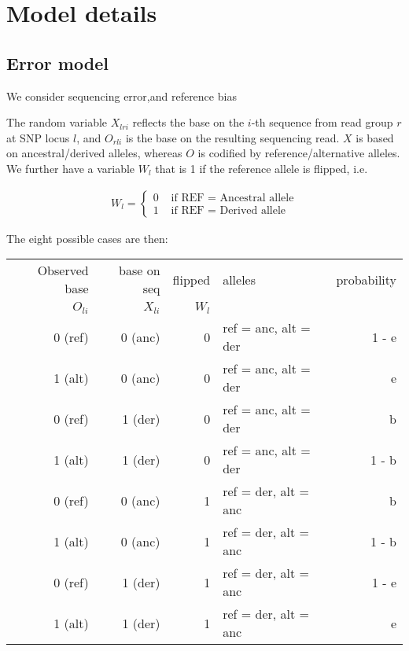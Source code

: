 \documentclass[10pt,a4paper]{article}
\begin{document}
\section*{Model details}
\subsection*{Error model}
We consider sequencing error,and reference bias

The random variable $X_{lri}$ reflects the base on the $i$-th sequence from read group $r$ at SNP locus $l$, and  $O_{rli}$ is the base on the resulting sequencing read. $X$ is based on ancestral/derived alleles, whereas $O$ is codified by reference/alternative alleles. We further have a variable $W_l$ that is 1 if the reference allele is flipped, i.e.

\begin{align*}
W_l = \begin{cases}
0 & \text{ if REF = Ancestral allele}\\
1&  \text{ if REF = Derived allele}
\end{cases}
\end{align*}

The eight possible cases are then:

\begin{table}[!ht]
\begin{center}

\begin{tabular}{r r r l | r}
Observed base & base on seq & flipped & alleles & probability\\
$O_{li}$ & $X_{li}$ & $W_l$ &\\
\hline
0 (ref) & 0 (anc)& 0 &ref = anc, alt = der & 1 - e\\
1 (alt) & 0 (anc)& 0 &ref = anc, alt = der& e\\
0 (ref) & 1 (der)& 0 &ref = anc, alt = der& b\\
1 (alt) & 1 (der)& 0 &ref = anc, alt = der& 1 - b\\
0 (ref) & 0 (anc)& 1 &ref = der, alt = anc& b \\
1 (alt) & 0 (anc)& 1 &ref = der, alt = anc& 1 - b\\
0 (ref) & 1 (der)& 1 &ref = der, alt = anc& 1 - e\\
1 (alt) & 1 (der)& 1 &ref = der, alt = anc& e \\
\end{tabular}
\end{center}
\end{table}
\end{document}
